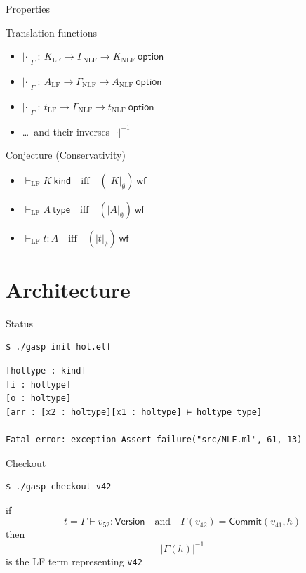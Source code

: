 \documentclass[ignorenonframetext,red]{beamer}
\newcommand\jlangt[4]{{#2}\vdash_{\mathrm{#1}}{#3}:{#4}}
\newcommand\jlangA[3]{{#2}\vdash_{\mathrm{#1}}{#3}\mathsf{\ type}}
\newcommand\jlangK[3]{{#2}\vdash_{\mathrm{#1}}{#3}\mathsf{\ kind}}
\newcommand\jlft[3]{\jlangt{LF}{#1}{#2}{#3}}
\newcommand\jlfA[2]{\jlangA{LF}{#1}{#2}}
\newcommand\jlfK[2]{\jlangK{LF}{#1}{#2}}
\newcommand\jwf[1]{{#1}\ \mathsf{wf}}
\begin{document}
\begin{frame}{Properties}
  \begin{block}{Translation functions}
    \begin{itemize}
    \item $|\cdot|_\Gamma\ :\ K_{\mathrm{LF}} \to
      \Gamma_{\mathrm{NLF}} \to K_{\mathrm{NLF}}\ \mathsf{option}$
    \item $|\cdot|_\Gamma\ :\ A_{\mathrm{LF}} \to
      \Gamma_{\mathrm{NLF}} \to A_{\mathrm{NLF}}\ \mathsf{option}$
    \item $|\cdot|_\Gamma\ :\ t_{\mathrm{LF}} \to
      \Gamma_{\mathrm{NLF}} \to t_{\mathrm{NLF}}\ \mathsf{option}$
    \item \ldots\ and their inverses $|\cdot|^{-1}$
    \end{itemize}
  \end{block}
  \begin{block}{Conjecture (Conservativity)}
    \begin{itemize}
    \item $\jlfK {} K \quad\text{iff}\quad \jwf{(|K|_\emptyset)}$
    \item $\jlfA {} A \quad\text{iff}\quad \jwf{(|A|_\emptyset)}$
    \item $\jlft {} t A \quad\text{iff}\quad \jwf{(|t|_\emptyset)} $
    \end{itemize}    
  \end{block}
\end{frame}

\section{Architecture}

\begin{frame}[fragile]{Status}
\small
\begin{verbatim}
$ ./gasp init hol.elf
\end{verbatim}
\pause
\begin{verbatim}
[holtype : kind]
[i : holtype]
[o : holtype]
[arr : [x2 : holtype][x1 : holtype] ⊢ holtype type]

Fatal error: exception Assert_failure("src/NLF.ml", 61, 13)
\end{verbatim}
\end{frame}

\begin{frame}[fragile]{Checkout}
\small
\begin{verbatim}
$ ./gasp checkout v42
\end{verbatim}
\normalsize
if
\[t = \Gamma\vdash v_{52} : \mathsf{Version} \quad\text{and}\quad
\Gamma(v_{42}) = \mathsf{Commit}(v_{41},h) \]
then 
\[ |\Gamma(h)|^{-1} \]
is the LF term representing \texttt{v42}
\end{frame}
\end{document}
